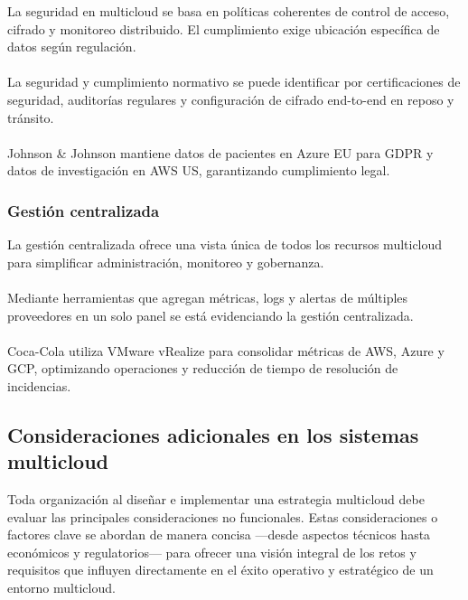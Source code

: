 {            
                La seguridad en multicloud se basa en políticas coherentes de control de acceso, cifrado y monitoreo distribuido. El cumplimiento exige ubicación específica de datos según regulación.
                
                \paragraph{}La seguridad y cumplimiento normativo se puede identificar por certificaciones de seguridad, auditorías regulares y configuración de cifrado end-to-end en reposo y tránsito.
                
                \paragraph{}Johnson & Johnson mantiene datos de pacientes en Azure EU para GDPR y datos de investigación en AWS US, garantizando cumplimiento legal.
            
            \subsubsection{Gestión centralizada}
                La gestión centralizada ofrece una vista única de todos los recursos multicloud para simplificar administración, monitoreo y gobernanza.
            
                \paragraph{}Mediante herramientas que agregan métricas, logs y alertas de múltiples proveedores en un solo panel se está evidenciando la gestión centralizada.
                
                \paragraph{}Coca-Cola utiliza VMware vRealize para consolidar métricas de AWS, Azure y GCP, optimizando operaciones y reducción de tiempo de resolución de incidencias.
            
        \subsection[Consideraciones especiales]{Consideraciones adicionales en los sistemas multicloud}
            Toda organización al diseñar e implementar una estrategia multicloud debe evaluar las principales consideraciones no funcionales. Estas consideraciones o factores clave se abordan de manera concisa —desde aspectos técnicos hasta económicos y regulatorios— para ofrecer una visión integral de los retos y requisitos que influyen directamente en el éxito operativo y estratégico de un entorno multicloud.

}
